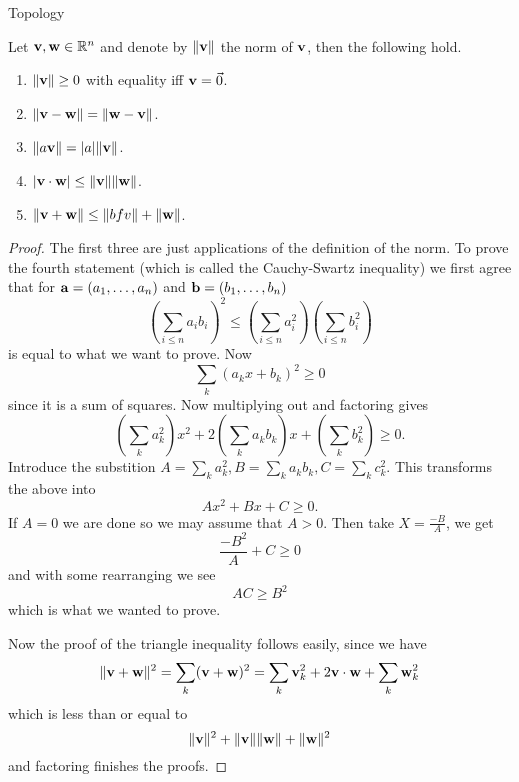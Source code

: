 \begin{chapter}{Topology}
    \begin{thm}
        Let $\mathbf{v}, \mathbf{w} \in \mathbb{R}^{n}$ and denote by  $\|\mathbf{v}\|$ the norm of $\mathbf{v}$, then the following hold. 
        \begin{enumerate}
            \item $\norm{\bfv} \geq 0$ with equality iff $\mathbf{v} = \vec{0}$.
            \item $\| \mathbf{v} - \mathbf{w} \| = \| \mathbf{w} - \mathbf{v} \|$.
            \item $\| a\mathbf{v} \| = |a| \| \mathbf{v} \|$.
            \item $|\mathbf{v} \cdot \mathbf{w} | \leq \|\mathbf{v} \| \|\mathbf{w} \|$. 
            \item $\|\mathbf{v} + \mathbf{w} \| \leq \|bfv\| + \| \mathbf{w} \|$. 
        \end{enumerate}


    \end{thm}


    \begin{proof}
        The first three are just applications of the definition of the norm. 
        To prove the fourth statement (which is called the Cauchy-Swartz inequality) we first agree that for 
        $\mathbf{a} = (a_1, \dots, a_n)$ and $\mathbf{b} = (b_1, \dots, b_n)$
        \begin{equation}
            \left(\sum_{i\leq n} a_ib_i \right)^2 \leq \left(\sum_{i \leq n} a^2_i \right) \left(\sum_{i \leq n}b^2_i \right)
        \end{equation}
        is equal to what we want to prove. Now 
        \[\sum_k (a_kx + b_k)^2 \geq 0\]
        since it is a sum of squares. Now multiplying out and factoring gives 
        \[\left(\sum_k a_k^2\right)x^2 + 2\left(\sum_k a_kb_k\right)x + \left(\sum_k b^2_k\right) \geq 0.\]
        Introduce the substition $A = \sum_k a_k^2, B = \sum_k a_kb_k, C = \sum_k c^2_k$. This transforms the above into 
        \[Ax^2 + Bx + C \geq 0.\]
        If $A = 0$ we are done so we may assume that $A > 0$. Then take $X = \frac{-B}{A}$, we get 
        \[\frac{-B^2}{A} + C \geq 0\]
        and with some rearranging we see 
        \[AC \geq B^2\]
        which is what we wanted to prove. 

        Now the proof of the triangle inequality follows easily, since we have 
        \[\| \mathbf{v} + \mathbf{w} \|^2 = \sum_k (\mathbf{v} + \mathbf{w})^2 = \sum_k \mathbf{v}^2_k + 2 \mathbf{v} \cdot \mathbf{w} + \sum_k \mathbf{w}^2_k\]
        which is less than or equal to 
        \[\|\mathbf{v} \|^2 + \| \mathbf{v} \| \|\mathbf{w}\| + \|\mathbf{w}\|^2\]
        and factoring finishes the proofs. 
    \end{proof}


\end{chapter}
